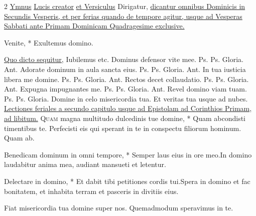 \begin{multicols*}{2}
\newline \ul{Ymnus} \hyperlink{lucis-creator}{Lucis creator} \ul{et Versiculus} Dirigatur, \ul{dicantur omnibus Dominicis in Secundis Vesperis, et per ferias quando de tempore agitur, usque ad Vesperas Sabbati ante Primam Dominicam Quadragesime exclusive.}
{\color{Red} }
\par {}
\begin{invitatory}
{Venite, * Exultemus domino.}
\end{invitatory}
\newline \ul{Quo dicto sequitur,} Iubilemus etc.
 Dominus defensor vite mee. {\color{Red} Ps.}  {\color{Red} Ps.}  Gloria. {\color{Red} Ant.} Adorate dominum in aula sancta eius. {\color{Red} Ps.}  {\color{Red} Ps.}  Gloria. {\color{Red} Ant.} In tua iusticia libera me domine. {\color{Red} Ps.}  {\color{Red} Ps.}  Gloria. {\color{Red} Ant.} Rectos decet collaudatio. {\color{Red} Ps.}  {\color{Red} Ps.}  Gloria. {\color{Red} Ant.} Expugna impugnantes me. {\color{Red} Ps.}  {\color{Red} Ps.}  Gloria. {\color{Red} Ant.} Revel domino viam tuam. {\color{Red} Ps.}  {\color{Red} Ps.}  Gloria. \V Domine in celo misericordia tua. \R Et veritas tua usque ad nubes.
\newline \ul{Lectiones feriales a secundo capitulo usque ad Epistolam ad Corinthios Primam, ad libitum.} \R
\lettrine[lines=2]{\zallmancaps \color{Red} Q}{uam} \hypertarget{quam-magna}{\label{quam-magna}} magna multitudo dulcedinis tue domine, * Quam abcondisti timentibus te. \V Perfecisti eis qui sperant in te in conspectu filiorum hominum. Quam ab.
\begin{responsory}
{Benedicam dominum in omni tempore, * Semper laus eius in ore meo.}{In domino laudabitur anima mea, audiant mansueti et letentur.}
\end{responsory}%
\begin{responsory-doxology}
{Delectare in domino, * Et dabit tibi petitiones cordis tui.}{Spera in domino et fac bonitatem, et inhabita terram et pasceris in divitiis eius.}
\end{responsory-doxology}%
\newline \V Fiat misericordia tua domine super nos.
\newline \R Quemadmodum speravimus in te.

\end{multicols*}
